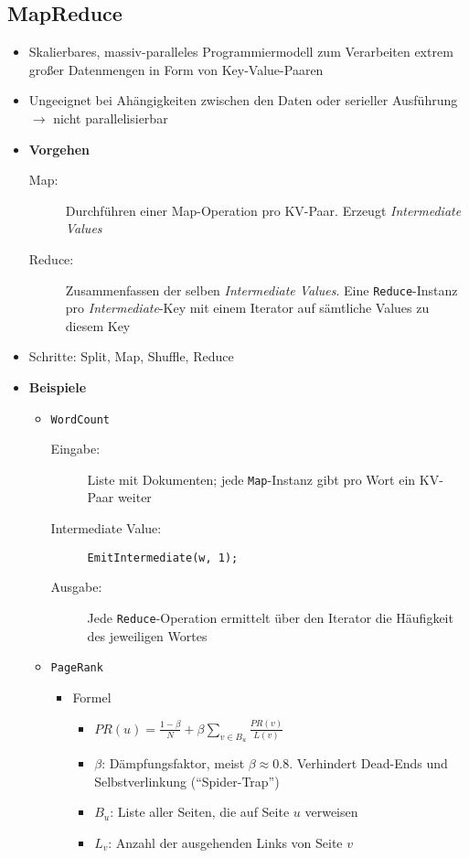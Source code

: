 \subsection{MapReduce}
\begin{itemize}
	\item Skalierbares, massiv-paralleles Programmiermodell zum Verarbeiten extrem großer Datenmengen in Form von Key-Value-Paaren
	\item Ungeeignet bei Ahängigkeiten zwischen den Daten oder serieller Ausführung \(\rightarrow\)  nicht parallelisierbar
	\item \textbf{Vorgehen}
	\begin{description}
		\item[Map:] Durchführen einer Map-Operation pro KV-Paar. Erzeugt \textit{Intermediate Values}
		\item[Reduce:] Zusammenfassen der selben \textit{Intermediate Values}. Eine \texttt{Reduce}-Instanz pro \textit{Intermediate}-Key mit einem Iterator auf sämtliche Values zu diesem Key
	\end{description}
	\item Schritte: Split, Map, Shuffle, Reduce
	\item \textbf{Beispiele}
	\begin{itemize}
		\item \texttt{WordCount}
		\begin{description}
			\item[Eingabe:] Liste mit Dokumenten; jede \texttt{Map}-Instanz gibt pro Wort ein KV-Paar weiter
			\item[Intermediate Value:] \texttt{EmitIntermediate(w, 1);}
			\item[Ausgabe:] Jede \texttt{Reduce}-Operation ermittelt über den Iterator die Häufigkeit des jeweiligen Wortes
		\end{description}
		\item \texttt{PageRank}
		\begin{itemize}
			\item Formel
			\begin{itemize}
				\item \(PR(u) = \frac{1-\beta}{N} + \beta \sum_{v \in B_u}\frac{PR(v)}{L(v)}\)
				\item \(\beta\): Dämpfungsfaktor, meist \(\beta \approx 0.8\). Verhindert Dead-Ends und Selbstverlinkung ("`Spider-Trap"')
				\item \(B_u\): Liste aller Seiten, die auf Seite \(u\) verweisen
				\item \(L_v\): Anzahl der ausgehenden Links von Seite \(v\)

\end{itemize}
\end{itemize}
\end{itemize}
\end{itemize}

